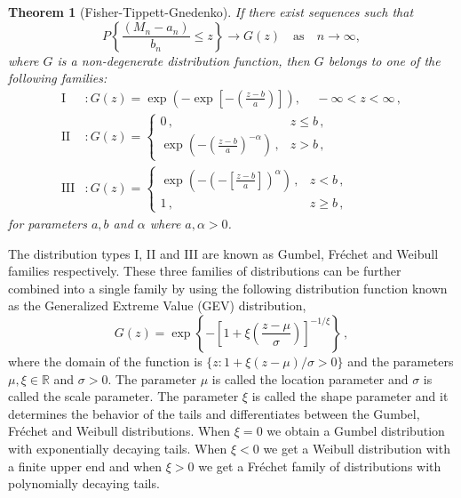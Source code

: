 \documentclass[letter,12pt]{article}
\newtheorem{theorem}{Theorem}
\begin{document}
\begin{theorem}[Fisher-Tippett-Gnedenko] \label{thm:FisherTippett}
If there exist sequences such that 
$$ P\left\{ \frac{(M_n - a_n)}{b_n} \leq z \right\} \rightarrow G(z) \quad \text{as} \quad n \to \infty,
$$
where $G$ is a non-degenerate distribution function, then $G$ belongs to one of the following families:
\begin{align}\label{eq:EVT3}
    \text{I}&: G(z) = \exp\left( -\exp \left[ - \left( \frac{z-b}{a}\right) \right] \right), \, \quad -\infty < z < \infty\, ,  \\
    \text{II}&: G(z) =  \begin{cases}
                                   0\, ,    &  z \leq b \, ,  \\
                                   \exp \left( - \left( \frac{z-b}{a}\right)^{-\alpha} \right)\, ,   & z > b \, , 
                    \end{cases} \\
     \text{III}&: G(z) =  \begin{cases}
                            \exp \left( - \left(- \left[\frac{z-b}{a}\right]\right)^{\alpha} \right)\, ,   & z < b \, , \\
                             1\, ,    &  z \geq b  \, , 
                    \end{cases}                     
\end{align}
 for parameters $a, b$ and $\alpha$ where $a, \alpha >0$.
\end{theorem}
The distribution types I, II and III are known as Gumbel, Fr\'echet and Weibull families respectively. These three families of distributions can be further combined into a single family by using the following distribution function known as the Generalized Extreme Value (GEV) distribution,
\begin{equation}\label{eq:EVT4}
    G(z) = \exp\left\{ -\left[ 1 + \xi\left(\frac{z - \mu}{\sigma} \right)\right]^{-1/\xi} \right\}\, , 
\end{equation}
where the domain of the function is $\{z: 1 + \xi (z - \mu)/\sigma >0 \}$ and the parameters $\mu, \xi \in \mathbb{R}$ and $\sigma > 0$. The parameter $\mu$ is called the location parameter and $\sigma$ is called the scale parameter. The parameter $\xi$ is called the shape parameter and it  determines the behavior of the tails and differentiates between the Gumbel, Fr\'echet and Weibull distributions. When $\xi = 0$ we obtain a Gumbel distribution with exponentially decaying tails. When $\xi <0 $ we get a Weibull distribution with a finite upper end and when $\xi > 0$ we get a Fr\'echet family of distributions with   polynomially decaying tails. 
\end{document}
